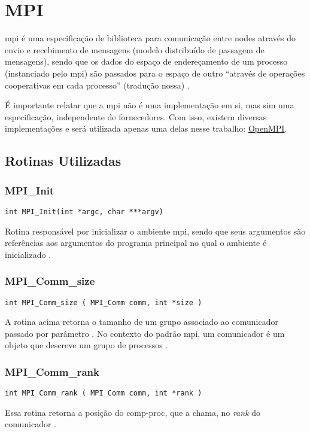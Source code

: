 \section{MPI}

\acrfull{mpi} é uma especificação de biblioteca para comunicação entre \glspl{node} 
através do envio e recebimento de mensagens
(modelo distribuído de passagem de mensagens), sendo que os dados do espaço de
endereçamento %
de um processo (instanciado pelo \acrshort{mpi})
são passados para o espaço de outro ``através de operações cooperativas em cada
processo'' (tradução nossa) \cite{doc:mpi}.

É importante relatar que a \acrshort{mpi} não é uma implementação em si, mas
sim uma especificação, independente de fornecedores. Com isso, existem
diversas implementações e será utilizada apenas uma delas nesse trabalho:
\hyperlink{https://www.open-mpi.org/}{OpenMPI}.

\subsection{Rotinas Utilizadas}

\subsubsection{MPI\_Init}
\begin{lstlisting}
int MPI_Init(int *argc, char ***argv)
\end{lstlisting}
Rotina responsável por inicializar o ambiente \acrshort{mpi}, sendo que seus 
argumentos são referências aos argumentos do programa principal no qual o ambiente 
é inicializado \cite{man:mpi_init}.
\\
\subsubsection{MPI\_Comm\_size}
\begin{lstlisting}
int MPI_Comm_size ( MPI_Comm comm, int *size )
\end{lstlisting}
A rotina acima retorna o tamanho de um grupo associado ao comunicador passado por
parâmetro \cite{man:mpi_comm_size}. No contexto do padrão \acrshort{mpi}, um comunicador 
é um objeto que descreve um  grupo de processos \cite{victor:openMP-MPI}.
\\
\subsubsection{MPI\_Comm\_rank}
\begin{lstlisting}
int MPI_Comm_rank ( MPI_Comm comm, int *rank )
\end{lstlisting}
Essa rotina retorna a posição do \gls{comp-proc}, que a chama, no \textit{rank} do 
comunicador \cite{man:mpi_comm_rank}.
\\

